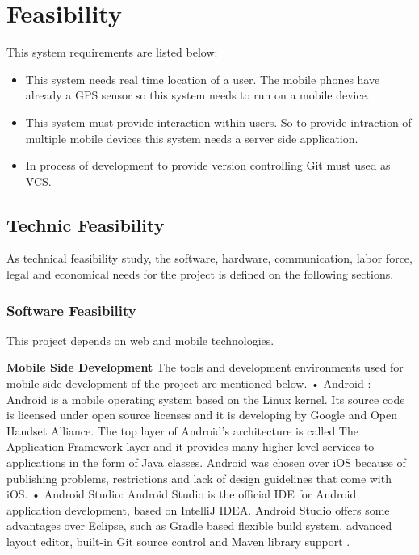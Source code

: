 \chapter{Feasibility}
This system requirements are listed below:
\begin{itemize}
    \item This system needs real time location of a user. The mobile phones have already a GPS sensor so this system needs to run on a mobile device.
    \item This system must provide interaction within users. So to provide intraction of multiple mobile devices this system needs a server side application.
    \item In process of development to provide version controlling Git must used as VCS.
\end{itemize}

\section{Technic Feasibility}
As technical feasibility study, the software, hardware, communication, labor force, legal and economical needs for the project is defined on the following sections.
\subsection{Software Feasibility}

This project depends on web and mobile technologies.

\textbf{Mobile Side Development}
\newline
The tools and development environments used for mobile side development of the
project are mentioned below.
\newline
• Android \cite{android}: Android is a mobile operating system based on the Linux kernel. Its
source code is licensed under open source licenses and it is developing by Google
and Open Handset Alliance. The top layer of Android’s architecture is called
The Application Framework layer and it provides many higher-level services to
applications in the form of Java classes. Android was chosen over iOS \cite{iOS} because
of publishing problems, restrictions and lack of design guidelines that come with
iOS.
\newline
• Android Studio: Android Studio is the official IDE for Android application
development, based on IntelliJ IDEA. Android Studio offers some advantages
over Eclipse, such as Gradle based flexible build system, advanced layout editor,
built-in Git source control and Maven library support \cite{androidStudio}.
\newline

